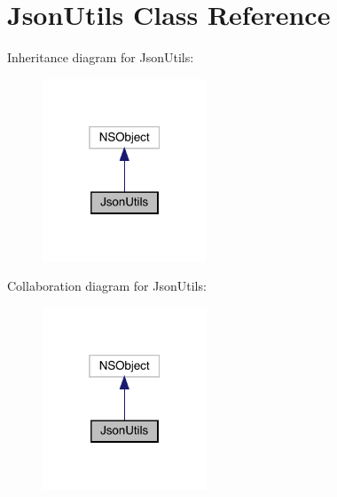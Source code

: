 \hypertarget{interface_json_utils}{}\section{Json\+Utils Class Reference}
\label{interface_json_utils}


Inheritance diagram for Json\+Utils\+:\nopagebreak
\begin{figure}[H]
\begin{center}
\leavevmode
\includegraphics[width=139pt]{interface_json_utils__inherit__graph}
\end{center}
\end{figure}


Collaboration diagram for Json\+Utils\+:\nopagebreak
\begin{figure}[H]
\begin{center}
\leavevmode
\includegraphics[width=139pt]{interface_json_utils__coll__graph}
\end{center}
\end{figure}
